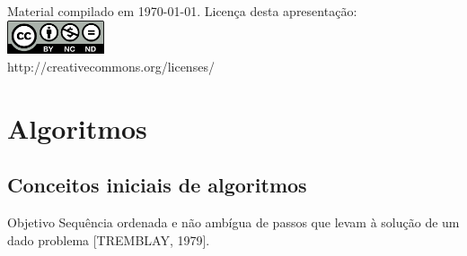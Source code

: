 \documentclass[portuguese,10pt,xcolor=table]{bredelebeamer}
\title{\insertlecture}
\author{Prof. Fernando Figueira\\(adaptado do material do Prof. Rafael Beserra Gomes)}
\institute{UFRN}
\date{}
\begin{document}
\begin{frame}
  \maketitle
 \begin{center}
 \tiny
Material compilado em \today.
  Licença desta apresentação:\\
		\includegraphics[height=1.0cm]{by-nc-nd.png}\\
http://creativecommons.org/licenses/
	\end{center}
\end{frame}

\section{Algoritmos}

\subsection{Conceitos iniciais de algoritmos}
	\begin{frame} 
		\begin{beamerboxesrounded}{Objetivo}
		Sequência ordenada e não ambígua de passos que levam à solução de um dado problema [TREMBLAY, 1979].
		\end{beamerboxesrounded}
	\end{frame}
\end{document}
